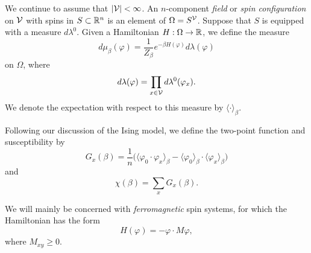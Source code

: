We continue to assume that $|\mathcal{V}| < \infty$.
An $n$-component \emph{field} or \emph{spin configuration} on $\mathcal{V}$
with spins in $S \subset {\mathbb R}^n$ is an element of $\Omega = S^{\mathcal{V}}$.
Suppose that $S$ is equipped with a measure $d\lambda^0$.
Given a Hamiltonian $H : \Omega \rightarrow {\mathbb R}$, we define the measure
\begin{equation}
d\mu_\beta(\varphi)
  =
\frac{1}{Z_\beta} e^{-\beta H(\varphi)} d\lambda(\varphi)
\end{equation}
on $\Omega$, where
\begin{equation}
d\lambda(\varphi) = \prod_{x\in\mathcal{V}} d\lambda^0(\varphi_x).
\end{equation}
We denote the expectation with respect to this measure by $\langle\cdot\rangle_\beta$.
% 

Following our discussion of the Ising model, we define the two-point function
and susceptibility by
\begin{equation}
G_x(\beta)
  =
\frac{1}{n}
\big(\langle \varphi_0 \cdot \varphi_x \rangle_\beta
  -
\langle \varphi_0 \rangle_\beta \cdot \langle \varphi_x \rangle_\beta\big)
\end{equation}
and
\begin{equation}
\chi(\beta) = \sum_x G_x(\beta).
\end{equation}

We will mainly be concerned with \emph{ferromagnetic} spin systems, for which the
Hamiltonian has the form
\begin{equation}
H(\varphi) = -\varphi \cdot M\varphi,
\end{equation}
where $M_{xy} \ge 0$.

